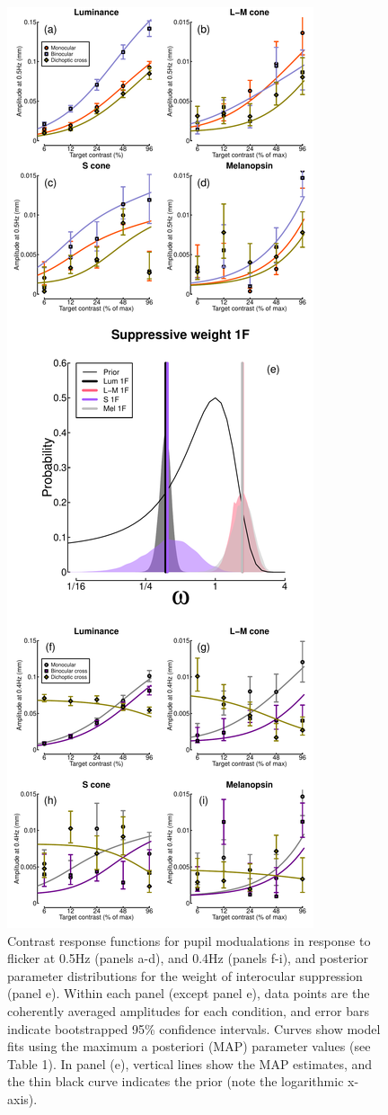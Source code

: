 \documentclass[
]{article}
\begin{document}
\begin{figure}

{\centering \includegraphics[width=0.4\linewidth]{Figures/FirstHarmonic} 

}

\caption{Contrast response functions for pupil modualations in response to flicker at 0.5Hz (panels a-d), and 0.4Hz (panels f-i), and posterior parameter distributions for the weight of interocular suppression (panel e). Within each panel (except panel e), data points are the coherently averaged amplitudes for each condition, and error bars indicate bootstrapped 95\% confidence intervals. Curves show model fits using the maximum a posteriori (MAP) parameter values (see Table 1). In panel (e), vertical lines show the MAP estimates, and the thin black curve indicates the prior (note the logarithmic x-axis).}\label{fig:FirstHarmonicPlots}
\end{figure}
\end{document}
